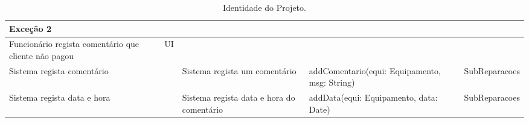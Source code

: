 \documentclass[../relatorio.tex]{subfiles}
\begin{document}
\begin{landscape}
\begin{table}[!h]
\begin{tabular}{|p{5cm}|p{1cm}|p{4cm}|p{6cm}|p{3cm}|}
            \hline
            \rowcolor{red!30}
            Exceção 2 &   &   &    & \\
            \hline
            \rowcolor{yellow}
            Funcionário regista comentário que cliente não pagou
                    & UI
                    &
                    &
                    &
            \\
            \hline
            Sistema regista comentário
                    & 
                    & Sistema regista um comentário
                    & addComentario(equi: Equipamento, msg: String)
                    & SubReparacoes
            \\
            \hline
            Sistema regista data e hora
                    & 
                    & Sistema regista data e hora do comentário
                    & addData(equi: Equipamento, data: Date)
                    & SubReparacoes
            \\
            \hline
        \end{tabular}
        \caption{Identidade do Projeto.}
    \end{table}
\end{landscape}
\end{document}
